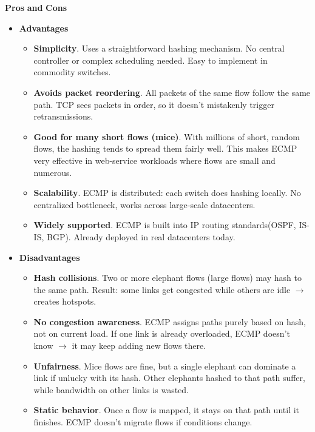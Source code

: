 \highspace
\begin{flushleft}
    \textcolor{Green3}{ \textbf{Pros}} \textbf{and} \textcolor{Red2}{ \textbf{Cons}}
\end{flushleft}
\begin{itemize}
    \item[\textcolor{Green3}{\faIcon{check-circle}}] \textcolor{Green3}{\textbf{Advantages}}
    \begin{itemize}
        \item[\textcolor{Green3}{\faIcon{check}}] \textcolor{Green3}{\textbf{Simplicity}}. Uses a straightforward hashing mechanism. No central controller or complex scheduling needed. Easy to implement in commodity switches.
        \item[\textcolor{Green3}{\faIcon{check}}] \textcolor{Green3}{\textbf{Avoids packet reordering}}. All packets of the same flow follow the same path. TCP sees packets in order, so it doesn't mistakenly trigger retransmissions.
        \item[\textcolor{Green3}{\faIcon{check}}] \textcolor{Green3}{\textbf{Good for many short flows (mice)}}. With millions of short, random flows, the hashing tends to spread them fairly well. This makes ECMP very effective in web-service workloads where flows are small and numerous.
        \item[\textcolor{Green3}{\faIcon{check}}] \textcolor{Green3}{\textbf{Scalability}}. ECMP is distributed: each switch does hashing locally. No centralized bottleneck, works across large-scale datacenters.
        \item[\textcolor{Green3}{\faIcon{check}}] \textcolor{Green3}{\textbf{Widely supported}}. ECMP is built into IP routing standards\break (OSPF, IS-IS, BGP). Already deployed in real datacenters today.
    \end{itemize}
    \item[\textcolor{Red2}{\faIcon{times-circle}}] \textcolor{Red2}{\textbf{Disadvantages}}
    \begin{itemize}
        \item[\textcolor{Red2}{\faIcon{times}}] \textcolor{Red2}{\textbf{Hash collisions}}. Two or more elephant flows (large flows) may hash to the same path. Result: some links get congested while others are idle $\rightarrow$ creates hotspots.
        \item[\textcolor{Red2}{\faIcon{times}}] \textcolor{Red2}{\textbf{No congestion awareness}}. ECMP assigns paths purely based on hash, not on current load. If one link is already overloaded, ECMP doesn't know $\rightarrow$ it may keep adding new flows there.
        \item[\textcolor{Red2}{\faIcon{times}}] \textcolor{Red2}{\textbf{Unfairness}}. Mice flows are fine, but a single elephant can dominate a link if unlucky with its hash. Other elephants hashed to that path suffer, while bandwidth on other links is wasted.
        \item[\textcolor{Red2}{\faIcon{times}}] \textcolor{Red2}{\textbf{Static behavior}}. Once a flow is mapped, it stays on that path until it finishes. ECMP doesn't migrate flows if conditions change.
    \end{itemize}
\end{itemize}
